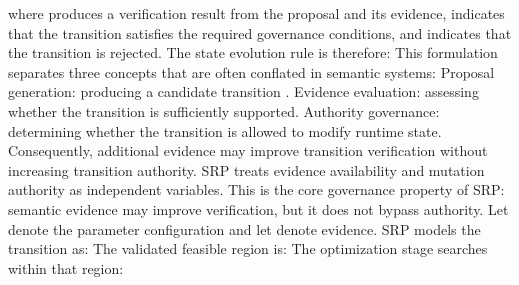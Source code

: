 {}\markdownRendererInterblockSeparator
{}where  produces a verification result from the proposal and its evidence,  indicates that the transition satisfies the required governance conditions, and  indicates that the transition is rejected.\markdownRendererParagraphSeparator
{}The state evolution rule is therefore:\markdownRendererInterblockSeparator
{}\markdownRendererInterblockSeparator
{}This formulation separates three concepts that are often conflated in semantic systems:\markdownRendererInterblockSeparator
{}\markdownRendererOlBeginTight
{}Proposal generation: producing a candidate transition .\markdownRendererOlItemEnd 
{}Evidence evaluation: assessing whether the transition is sufficiently supported.\markdownRendererOlItemEnd 
{}Authority governance: determining whether the transition is allowed to modify runtime state.\markdownRendererOlItemEnd 
\markdownRendererOlEndTight \markdownRendererInterblockSeparator
{}Consequently, additional evidence may improve transition verification without increasing transition authority. SRP treats evidence availability and mutation authority as independent variables.\markdownRendererParagraphSeparator
{}This is the core governance property of SRP: semantic evidence may improve verification, but it does not bypass authority.\markdownRendererInterblockSeparator
{}
\markdownRendererSectionEnd \markdownRendererSectionBegin
{}\markdownRendererInterblockSeparator
{}Let  denote the parameter configuration and let  denote evidence. SRP models the transition as:\markdownRendererInterblockSeparator
{}\markdownRendererInterblockSeparator
{}The validated feasible region is:\markdownRendererInterblockSeparator
{}\markdownRendererInterblockSeparator
{}The optimization stage searches within that region:\markdownRendererInterblockSeparator
{}\markdownRendererInterblockSeparator
